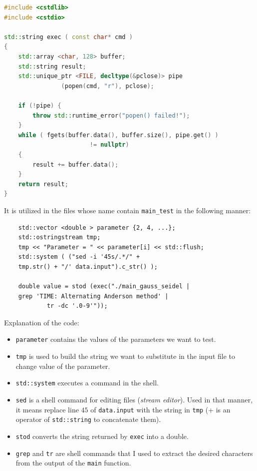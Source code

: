 \documentclass[12pt]{article}
\begin{document}
			\begin{lstlisting}[language=C++]
#include <cstdlib>
#include <cstdio>

std::string exec ( const char* cmd ) 
{
	std::array <char, 128> buffer;
	std::string result;
	std::unique_ptr <FILE, decltype(&pclose)> pipe
				(popen(cmd, "r"), pclose);
			
	if (!pipe) {
		throw std::runtime_error("popen() failed!");
	}
	while ( fgets(buffer.data(), buffer.size(), pipe.get() )
						!= nullptr) 
	{
		result += buffer.data();
	}
	return result;
}
			\end{lstlisting}
			It is utilized in the files whose name contain \verb|main_test|
			in the following manner:
			\begin{lstlisting}
	std::vector <double > parameter {2, 4, ...};
	std::ostringstream tmp;
	tmp << "Parameter = " << parameter[i] << std::flush;
	std::system ( ("sed -i '45s/.*/" + 
	tmp.str() + "/' data.input").c_str() );
	
	double value = stod (exec("./main_gauss_seidel |
	grep 'TIME: Alternating Anderson method' |
			tr -dc '.0-9'"));
			\end{lstlisting}
			Explanation of the code:
			\begin{itemize}
				\item \verb|parameter| contains the values of the parameters we want to test.
				\item \verb|tmp| is used to build the string we want to substitute in the input
				file to change value of the parameter.
				\item \verb|std::system| executes a command in the shell.
				\item \verb|sed| is a shell command for editing files (\textit{stream editor}).
				Used in that manner, it means replace line $45$ of \verb|data.input| with the string in
				\verb|tmp| (+ is an operator of \verb|std::string| to concatenate them).
				\item \verb|stod| converts the string returned by \verb|exec| into a double.
				\item \verb|grep| and \verb|tr| are shell commands that I used to extract the desired characters
				from the output of the \verb|main| function.
			\end{itemize}
				
		


			\printbibliography[heading=bibintoc,
			title={Bibliography}]
						
					
	
\end{document}
